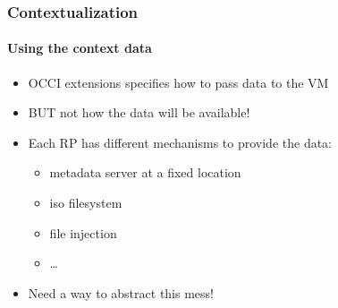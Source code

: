 
\begin{frame}
  \frametitle{Contextualization}
  \framesubtitle{Using the context data}

    \begin{itemize}
        \item OCCI extensions specifies how to pass data to the VM
        \item BUT not how the data will be available!
        \item Each RP has different mechanisms to provide the data:
        \begin{itemize}
            \item metadata server at a fixed location
            \item iso filesystem
            \item file injection
            \item \dots
        \end{itemize}
        \item Need a way to abstract this mess!
    \end{itemize}
\end{frame}



